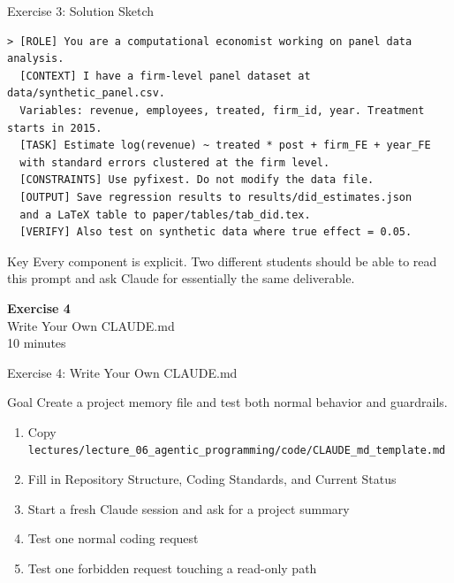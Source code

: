 \documentclass[aspectratio=169,10pt]{beamer}
\begin{document}
\begin{frame}[fragile]{Exercise 3: Solution Sketch}
\scriptsize
\begin{lstlisting}[style=prompt, basicstyle=\tiny\ttfamily]
> [ROLE] You are a computational economist working on panel data analysis.
  [CONTEXT] I have a firm-level panel dataset at data/synthetic_panel.csv.
  Variables: revenue, employees, treated, firm_id, year. Treatment starts in 2015.
  [TASK] Estimate log(revenue) ~ treated * post + firm_FE + year_FE
  with standard errors clustered at the firm level.
  [CONSTRAINTS] Use pyfixest. Do not modify the data file.
  [OUTPUT] Save regression results to results/did_estimates.json
  and a LaTeX table to paper/tables/tab_did.tex.
  [VERIFY] Also test on synthetic data where true effect = 0.05.
\end{lstlisting}

\begin{block}{Key}
Every component is explicit. Two different students should be able to read this
prompt and ask Claude for essentially the same deliverable.
\end{block}
\end{frame}

\begin{frame}{}
\vfill\begin{center}{\Huge \textcolor{uzhblue}{\textbf{Exercise 4}}}\\[12pt]
{\LARGE Write Your Own CLAUDE.md}\\[6pt]{\small 10 minutes}\end{center}\vfill
\end{frame}

\begin{frame}[fragile]{Exercise 4: Write Your Own CLAUDE.md}
\begin{exampleblock}{Goal}
Create a project memory file and test both normal behavior and guardrails.
\end{exampleblock}
\small
\begin{enumerate}\itemsep2pt
    \item Copy \texttt{lectures/lecture\_06\_agentic\_programming/code/CLAUDE\_md\_template.md}
    \item Fill in Repository Structure, Coding Standards, and Current Status
    \item Start a fresh Claude session and ask for a project summary
    \item Test one normal coding request
    \item Test one forbidden request touching a read-only path
\end{enumerate}
\end{frame}
\end{document}
